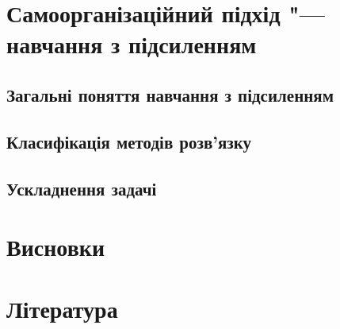 \documentclass[a4paper,10pt]{article}
\begin{document}
\section{Самоорганізаційний підхід "--- навчання з підсиленням}
\subsection{Загальні поняття навчання з підсиленням}
\subsection{Класифікація методів розв'язку}
\subsection{Ускладнення задачі}
\section{Висновки}
\section{Література}
\begin{thebibliography}{99}
\end{thebibliography}
\end{document}
